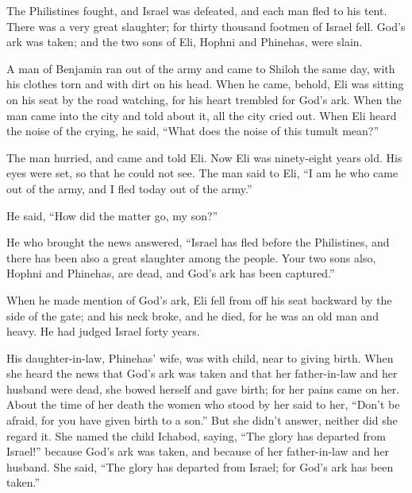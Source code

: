 {The Philistines fought, and Israel was defeated, and each man fled to his tent. There was a very great slaughter; for thirty thousand footmen of Israel fell.
God’s ark was taken; and the two sons of Eli, Hophni and Phinehas, were slain.
\par }{\PP {}A man of Benjamin ran out of the army and came to Shiloh the same day, with his clothes torn and with dirt on his head.
When he came, behold, Eli was sitting on his seat by the road watching, for his heart trembled for God’s ark. When the man came into the city and told about it, all the city cried out.
When Eli heard the noise of the crying, he said, “What does the noise of this tumult mean?”
\par }{\PP The man hurried, and came and told Eli.
Now Eli was ninety-eight years old. His eyes were set, so that he could not see.
The man said to Eli, “I am he who came out of the army, and I fled today out of the army.”
\par }{\PP He said, “How did the matter go, my son?”
\par }{\PP {}He who brought the news answered, “Israel has fled before the Philistines, and there has been also a great slaughter among the people. Your two sons also, Hophni and Phinehas, are dead, and God’s ark has been captured.”
\par }{\PP {}When he made mention of God’s ark, Eli fell from off his seat backward by the side of the gate; and his neck broke, and he died, for he was an old man and heavy. He had judged Israel forty years.
\par }{\PP {}His daughter-in-law, Phinehas’ wife, was with child, near to giving birth. When she heard the news that God’s ark was taken and that her father-in-law and her husband were dead, she bowed herself and gave birth; for her pains came on her.
About the time of her death the women who stood by her said to her, “Don’t be afraid, for you have given birth to a son.” But she didn’t answer, neither did she regard it.
She named the child Ichabod, saying, “The glory has departed from Israel!” because God’s ark was taken, and because of her father-in-law and her husband.
She said, “The glory has departed from Israel; for God’s ark has been taken.”

}
